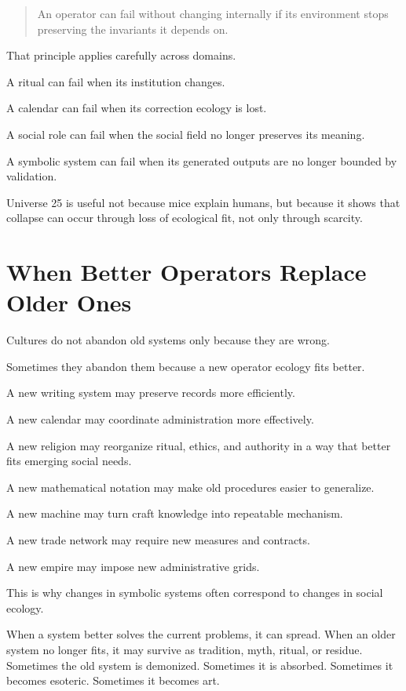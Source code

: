 \documentclass[11pt]{book}
\begin{document}
\begin{quote}
An operator can fail without changing internally if its environment stops preserving the invariants it depends on.
\end{quote}

That principle applies carefully across domains.

A ritual can fail when its institution changes.

A calendar can fail when its correction ecology is lost.

A social role can fail when the social field no longer preserves its meaning.

A symbolic system can fail when its generated outputs are no longer bounded by validation.

Universe 25 is useful not because mice explain humans, but because it shows that collapse can occur through loss of ecological fit, not only through scarcity.

\section{When Better Operators Replace Older Ones}

Cultures do not abandon old systems only because they are wrong.

Sometimes they abandon them because a new operator ecology fits better.

A new writing system may preserve records more efficiently.

A new calendar may coordinate administration more effectively.

A new religion may reorganize ritual, ethics, and authority in a way that better fits emerging social needs.

A new mathematical notation may make old procedures easier to generalize.

A new machine may turn craft knowledge into repeatable mechanism.

A new trade network may require new measures and contracts.

A new empire may impose new administrative grids.

This is why changes in symbolic systems often correspond to changes in social ecology.

When a system better solves the current problems, it can spread. When an older system no longer fits, it may survive as tradition, myth, ritual, or residue. Sometimes the old system is demonized. Sometimes it is absorbed. Sometimes it becomes esoteric. Sometimes it becomes art.
\end{document}
